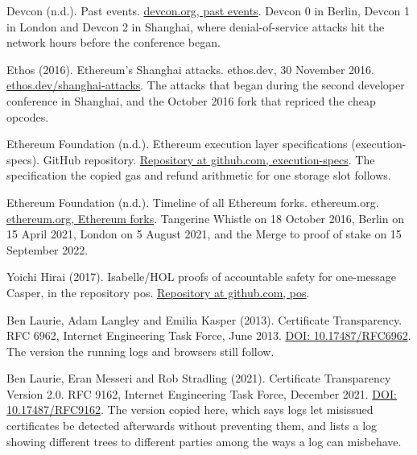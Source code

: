 \documentclass[11pt,twoside]{article}
\theoremstyle{thielethm}
\theoremstyle{thieledef}
\theoremstyle{thieledef}
\theoremstyle{thieledef}
\theoremstyle{thielethm}
\theoremstyle{thieleobs}
\theoremstyle{thielethm}
\begin{document}
\noindent Devcon (n.d.). Past events. \href{https://devcon.org/en/past-events/}{devcon.org, past events}. Devcon 0 in Berlin, Devcon 1 in London and Devcon 2 in Shanghai, where denial-of-service attacks hit the network hours before the conference began.
\par\medskip

\noindent Ethos (2016). Ethereum's Shanghai attacks. ethos.dev, 30 November 2016. \href{https://ethos.dev/shanghai-attacks}{ethos.dev/shanghai-attacks}. The attacks that began during the second developer conference in Shanghai, and the October 2016 fork that repriced the cheap opcodes.
\par\medskip

\noindent Ethereum Foundation (n.d.). Ethereum execution layer specifications (execution-specs). GitHub repository. \href{https://github.com/ethereum/execution-specs}{Repository at github.com, execution-specs}. The specification the copied gas and refund arithmetic for one storage slot follows.
\par\medskip

\noindent Ethereum Foundation (n.d.). Timeline of all Ethereum forks. ethereum.org. \href{https://ethereum.org/en/ethereum-forks/}{ethereum.org, Ethereum forks}. Tangerine Whistle on 18 October 2016, Berlin on 15 April 2021, London on 5 August 2021, and the Merge to proof of stake on 15 September 2022.
\par\medskip

\noindent Yoichi Hirai (2017). Isabelle/HOL proofs of accountable safety for one-message Casper, in the repository pos. \href{https://github.com/palmskog/pos}{Repository at github.com, pos}.
\par\medskip

\noindent Ben Laurie, Adam Langley and Emilia Kasper (2013). Certificate Transparency. RFC 6962, Internet Engineering Task Force, June 2013. \href{https://doi.org/10.17487/RFC6962}{DOI: 10.17487/RFC6962}. The version the running logs and browsers still follow.
\par\medskip

\noindent Ben Laurie, Eran Messeri and Rob Stradling (2021). Certificate Transparency Version 2.0. RFC 9162, Internet Engineering Task Force, December 2021. \href{https://doi.org/10.17487/RFC9162}{DOI: 10.17487/RFC9162}. The version copied here, which says logs let misissued certificates be detected afterwards without preventing them, and lists a log showing different trees to different parties among the ways a log can misbehave.
\par\medskip
\end{document}
